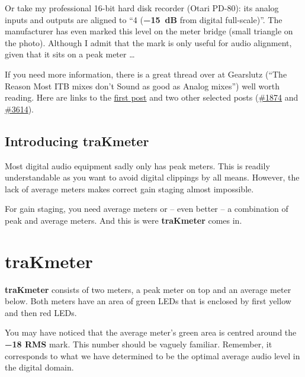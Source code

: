 Or take my professional 16-bit hard disk recorder (Otari PD-80): its
analog inputs and outputs are aligned to ``\SI[addsign=all]{+4}{\dBu}
(\textbf{\SI{-15}{\dB}} from digital full-scale)''.  The manufacturer
has even marked this level on the meter bridge (small triangle on the
photo).  Although I admit that the mark is only useful for audio
alignment, given that it sits on a peak meter \dots

If you need more information, there is a great thread over at
Gearslutz (``The Reason Most ITB mixes don’t Sound as good as Analog
mixes'') well worth reading.  Here are links to the
\href{http://www.gearslutz.com/board/5062929-post1.html}{first post}
and two other selected posts
(\href{http://www.gearslutz.com/board/5064831-post1874.html}{\#1874}
and
\href{http://www.gearslutz.com/board/5609740-post3614.html}{\#3614}).


\section{Introducing traKmeter}
\label{sec:introducing_trakmeter}

Most digital audio equipment sadly only has peak meters.  This is
readily understandable as you want to avoid digital clippings by all
means.  However, the lack of average meters makes correct gain staging
almost impossible.

For gain staging, you need average meters or -- even better -- a
combination of peak and average meters.  And this is were
\textbf{traKmeter} comes in.

\chapter{traKmeter}
\label{chap:trakmeter}

\textbf{traKmeter} consists of two meters, a peak meter on top and an
average meter below.  Both meters have an area of green LEDs that is
enclosed by first yellow and then red LEDs.

You may have noticed that the average meter's green area is centred
around the \textbf{\SI{-18}{\dBFS} RMS} mark.  This number should be
vaguely familiar.  Remember, it corresponds to what we have determined
to be the optimal average audio level in the digital domain.

